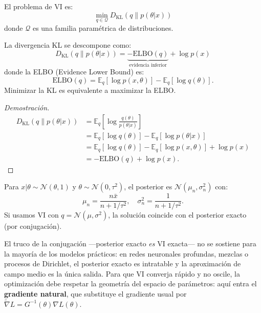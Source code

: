 \begin{definition}
	El problema de VI es:
	\[
	\min_{q \in \mathcal{Q}} D_{\mathrm{KL}}(q \| p(\theta | x))
	\]
	donde $\mathcal{Q}$ es una familia paramétrica de distribuciones.
\end{definition}

\begin{theorem}
	La divergencia KL se descompone como:
	\[
	D_{\mathrm{KL}}(q \| p(\theta | x)) = \underbrace{-\mathrm{ELBO}(q)}_{\text{evidencia inferior}} + \log p(x)
	\]
	donde la ELBO (Evidence Lower Bound) es:
	\[
	\mathrm{ELBO}(q) = \mathbb{E}_q[\log p(x, \theta)] - \mathbb{E}_q[\log q(\theta)].
	\]
	Minimizar la KL es equivalente a maximizar la ELBO.
\end{theorem}

\begin{proof}[Demostración]
	\begin{align*}
		D_{\mathrm{KL}}(q \| p(\theta|x))
		&= \mathbb{E}_q\!\left[\log \frac{q(\theta)}{p(\theta|x)}\right] \\
		&= \mathbb{E}_q[\log q(\theta)] - \mathbb{E}_q[\log p(\theta|x)] \\
		&= \mathbb{E}_q[\log q(\theta)] - \mathbb{E}_q[\log p(x,\theta)] + \log p(x) \\
		&= -\mathrm{ELBO}(q) + \log p(x).
	\end{align*}
\end{proof}

\begin{example}
	Para $x | \theta \sim \mathcal{N}(\theta, 1)$ y $\theta \sim \mathcal{N}(0, \tau^2)$, el posterior es $\mathcal{N}(\mu_n, \sigma_n^2)$ con:
	\[
	\mu_n = \frac{n\bar{x}}{n + 1/\tau^2}, \quad \sigma_n^2 = \frac{1}{n + 1/\tau^2}.
	\]
	Si usamos VI con $q = \mathcal{N}(\mu, \sigma^2)$, la solución coincide con el posterior exacto (por conjugación).
\end{example}

\bigskip
\noindent
El truco de la conjugación ---posterior exacto \emph{es} VI exacta--- no se sostiene para la mayoría de los modelos prácticos: en redes neuronales profundas, mezclas o procesos de Dirichlet, el posterior exacto es intratable y la aproximación de campo medio es la única salida. Para que VI converja rápido y no oscile, la optimización debe respetar la geometría del espacio de parámetros: aquí entra el \textbf{gradiente natural}, que substituye el gradiente usual por $\widetilde{\nabla} L = G^{-1}(\theta)\nabla L(\theta)$.

